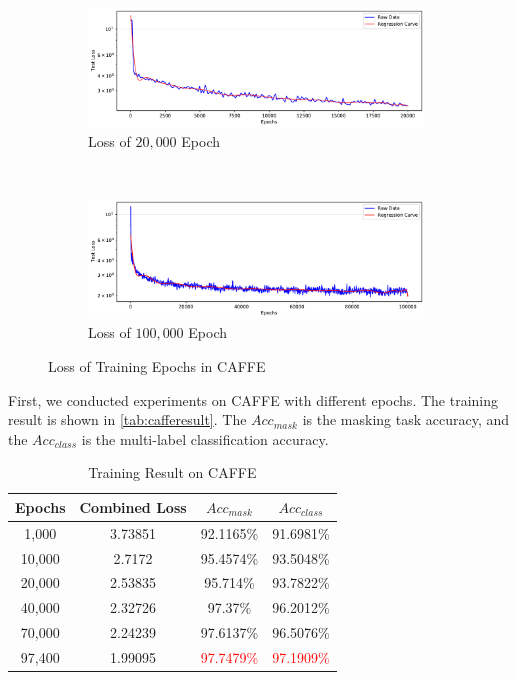 \begin{spacing}{1.5}
\begin{figure}[ht]
    \centering
    \begin{subfigure}[b]{0.99\textwidth}
        \centering
        \includegraphics[width=0.98\textwidth, fbox]{Chapter5/testloss20000.pdf}
        \caption{Loss of $20,000$ Epoch}
    \end{subfigure}
    \\
    \begin{subfigure}[b]{0.99\textwidth}
        \centering
        \includegraphics[width=0.98\textwidth, fbox]{Chapter5/testloss100000.pdf}
        \caption{Loss of $100,000$ Epoch}
    \end{subfigure}
    \caption{Loss of Training Epochs in CAFFE}
    \label{fig:testloss}
\end{figure}


First, we conducted experiments on CAFFE with different epochs. The training result is shown in \autoref{tab:cafferesult}. The $Acc_{mask}$ is the masking task accuracy, and the $Acc_{class}$ is the multi-label classification accuracy.

\begin{table}[ht]
\centering
\caption{Training Result on CAFFE}
\label{tab:cafferesult}
\begin{tabular}{@{}cccc@{}}
\toprule
\textbf{Epochs} & \textbf{Combined Loss} & \textbf{$Acc_{mask}$} & \textbf{$Acc_{class}$} \\ \midrule
1,000 & 3.73851 & 92.1165\% & 91.6981\% \\
10,000 & 2.7172 & 95.4574\% & 93.5048\% \\
20,000 & 2.53835 & 95.714\% & 93.7822\% \\
40,000 & 2.32726 & 97.37\% & 96.2012\% \\
70,000 & 2.24239 & 97.6137\% & 96.5076\% \\
97,400 & 1.99095 & \textcolor{red}{97.7479\%} & \textcolor{red}{97.1909\%} \\ \bottomrule
\end{tabular}
\end{table}


\end{spacing}
